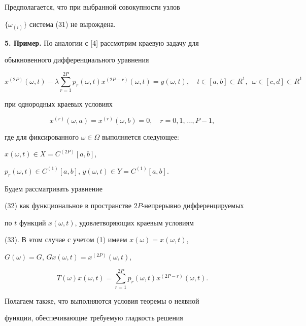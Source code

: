 Предполагается, что при выбранной совокупности узлов


$\{\omega_{(i)}\}$ система (31) не вырождена.


\medskip





{\bf 5. Пример.} По аналогии с [4] рассмотрим краевую задачу для


обыкновенного дифференциального уравнения


\begin{equation}


x^{(2P)}(\omega,t)-\lambda\sum^{2P}_{r=1}p_r(\omega,t)


x^{(2P-r)}(\omega,t)=y(\omega,t),\quad


t\in[a,b]\subset R^1,\ \;\omega\in[c,d]\subset R^1


\end{equation}


при однородных краевых условиях


\begin{equation}


x^{(r)}(\omega,a)=x^{(r)}(\omega,b)=0,\quad


r=0,1,\dotsc,P-1,


\end{equation}


где для фиксированного $\omega\in\Omega$ выполняется следующее:


$x(\omega,t)\in X=C^{(2P)}[a,b]$,


$p_r(\omega,t)\in C^{(1)}[a,b]$, $y(\omega,t)\in Y=C^{(1)}[a,b]$.


Будем рассматривать уравнение


(32) как функциональное в пространстве $2P$-непрерывно дифференцируемых


по $t$ функций $x(\omega,t)$, удовлетворяющих краевым условиям


(33). В этом случае с учетом (1) имеем $x(\omega)=x(\omega,t)$,


$G(\omega)=G$, $Gx(\omega,t)=x^{(2P)}(\omega,t)$,


$$


T(\omega)x(\omega,t)=\sum^{2P}_{r=1}p_r(\omega,t)


x^{(2P-r)}(\omega,t).


$$


Полагаем также, что выполняются условия теоремы о неявной


функции, обеспечивающие требуемую гладкость решения


